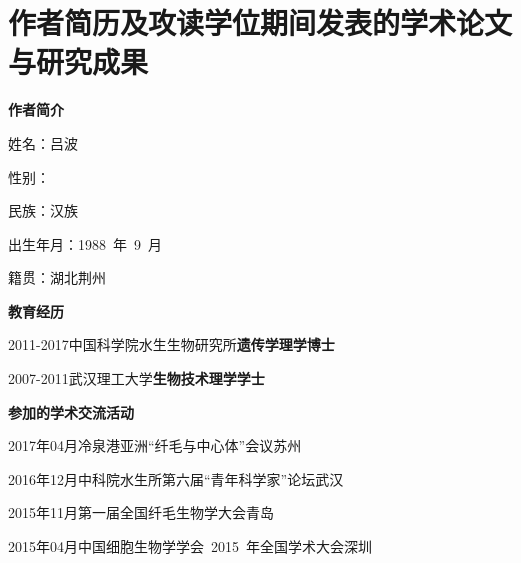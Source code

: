 \chapter{作者简历及攻读学位期间发表的学术论文与研究成果}
\renewcommand{\leftmark}{作者简历及攻读学位期间发表的学术论文与研究成果}

\vspace{1em}
\begin{asparaitem}[\CircleSolid]
\large
\item \textbf{作者简介}
    \begin{asparaitem}[\hspace{4em} \SixFlowerRemovedOpenPetal]
    \normalsize
    \item 姓\qquad 名：吕波
    \item 性\qquad 别：\Large \textbf{\mars} \normalsize
    \item 民\qquad 族：汉族
    \item 出生年月：1988\ 年\ 9\ 月
    \item 籍\qquad 贯：湖北荆州
    \end{asparaitem}
\vspace{1em}
\item \textbf{教育经历}
    \begin{asparaitem}[\hspace{4em} \SixFlowerRemovedOpenPetal]
    \normalsize
    \item 2011-2017\quad 中国科学院水生生物研究所\hfill \textbf{遗传学理学博士}
    \item 2007-2011\quad 武汉理工大学\hfill \textbf{生物技术理学学士}
    \end{asparaitem}
\vspace{1em}
\item \textbf{参加的学术交流活动}
    \begin{asparaitem}[\hspace{4em} \SixFlowerRemovedOpenPetal]
    \normalsize
    \item 2017年04月\quad 冷泉港亚洲“纤毛与中心体”会议\hfill 苏州
    \item 2016年12月\quad 中科院水生所第六届“青年科学家”论坛\hfill 武汉
    \item 2015年11月\quad 第一届全国纤毛生物学大会\hfill 青岛
    \item 2015年04月\quad 中国细胞生物学学会\ 2015\ 年全国学术大会\hfill 深圳

\end{asparaitem}
\end{asparaitem}
